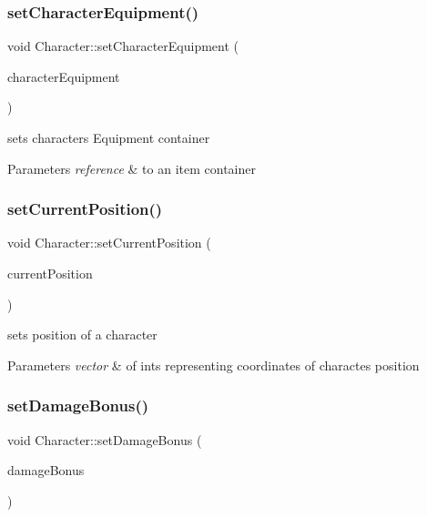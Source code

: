 \subsubsection{\texorpdfstring{set\+Character\+Equipment()}{setCharacterEquipment()}}
{\footnotesize\ttfamily void Character\+::set\+Character\+Equipment (\begin{DoxyParamCaption}\item[{\hyperlink{class_item_container}{Item\+Container} $\ast$}]{character\+Equipment }\end{DoxyParamCaption})}

sets characters Equipment container 
\begin{DoxyParams}{Parameters}
{\em reference} & to an item container \\
\hline
\end{DoxyParams}
\hypertarget{class_character_a89b588fbe9b28bb6c907b33f75bc31bc}{}\label{class_character_a89b588fbe9b28bb6c907b33f75bc31bc} 
\subsubsection{\texorpdfstring{set\+Current\+Position()}{setCurrentPosition()}}
{\footnotesize\ttfamily void Character\+::set\+Current\+Position (\begin{DoxyParamCaption}\item[{vector$<$ int $>$}]{current\+Position }\end{DoxyParamCaption})}

sets position of a character 
\begin{DoxyParams}{Parameters}
{\em vector} & of ints representing coordinates of charactes position \\
\hline
\end{DoxyParams}
\hypertarget{class_character_a04149679169d970edde15b0d3e6e9428}{}\label{class_character_a04149679169d970edde15b0d3e6e9428} 
\subsubsection{\texorpdfstring{set\+Damage\+Bonus()}{setDamageBonus()}}
{\footnotesize\ttfamily void Character\+::set\+Damage\+Bonus (\begin{DoxyParamCaption}\item[{int}]{damage\+Bonus }\end{DoxyParamCaption})}

